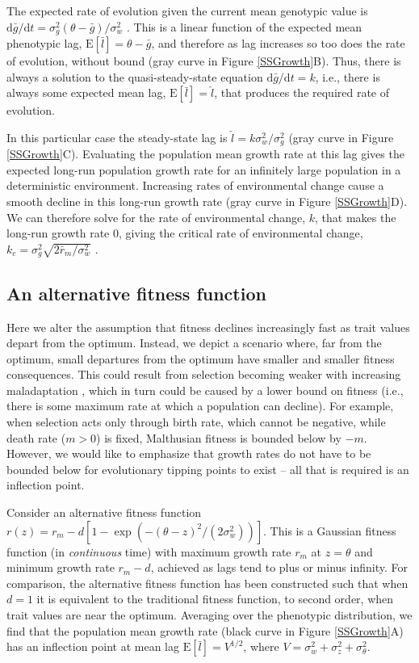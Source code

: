 \documentclass[12pt,letterpaper]{article} %
\begin{document}
The expected rate of evolution given the current mean genotypic value is $\mathrm{d}\bar{g}/\mathrm{d}t = \sigma_g^2 (\theta - \bar{g}) / \sigma_w^2$ \citep[][equation 5]{Lynch1993}.
This is a linear function of the expected mean phenotypic lag, $\mathrm{E}[\bar{l}] = \theta - \bar{g}$, and therefore as lag increases so too does the rate of evolution, without bound (gray curve in Figure \ref{SSGrowth}B).
Thus, there is always a solution to the quasi-steady-state equation $\mathrm{d}\bar{g}/\mathrm{d}t  = k$, i.e., there is always some expected mean lag, $\mathrm{E}[\bar{l}]=\hat{l}$, that produces the required rate of evolution.

In this particular case the steady-state lag is $\hat{l} = k \sigma_w^2/\sigma_g^2$ (gray curve in Figure \ref{SSGrowth}C).
Evaluating the population mean growth rate at this lag gives the expected long-run population growth rate for an infinitely large population in a deterministic environment.
Increasing rates of environmental change cause a smooth decline in this long-run growth rate (gray curve in Figure \ref{SSGrowth}D).
We can therefore solve for the rate of environmental change, $k$, that makes the long-run growth rate 0, giving the critical rate of environmental change, $k_c = \sigma_g^2 \sqrt{2\bar{r}_m/\sigma_w^2}$ \citep[][equation 11]{Lynch1993}.

\subsection*{An alternative fitness function}

Here we alter the assumption that fitness declines increasingly fast as trait values depart from the optimum.
Instead, we depict a scenario where, far from the optimum, small departures from the optimum have smaller and smaller fitness consequences.
This could result from selection becoming weaker with increasing maladaptation \citep[for which there is some evidence;][]{Agrawal2010}, which in turn could be caused by a lower bound on fitness (i.e., there is some maximum rate at which a population can decline).
For example, when selection acts only through birth rate, which cannot be negative, while death rate ($m>0$) is fixed, Malthusian fitness is bounded below by $-m$.
However, we would like to emphasize that growth rates do not have to be bounded below for evolutionary tipping points to exist -- all that is required is an inflection point.

Consider an alternative fitness function $r(z) = r_m - d\left[1 - \exp\left(-(\theta-z)^2/(2\sigma_w^2)\right)\right]$.
This is a Gaussian fitness function (in \textit{continuous} time) with maximum growth rate $r_m$ at $z=\theta$ and minimum growth rate $r_m-d$, achieved as lags tend to plus or minus infinity.
For comparison, the alternative fitness function has been constructed such that when $d=1$ it is equivalent to the traditional fitness function, to second order, when trait values are near the optimum.
Averaging over the phenotypic distribution, we find that the population mean growth rate (black curve in Figure \ref{SSGrowth}A) has an inflection point at mean lag $\mathrm{E}[\bar{l}] = V^{1/2}$, where $V = \sigma_w^2 + \sigma_z^2 + \sigma_\theta^2$.
\end{document}
